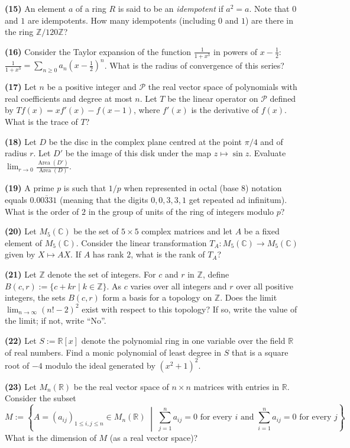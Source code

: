 \documentclass[11pt,a4paper]{article}
\newcommand{\Z}{\mathbb{Z}}
\newcommand{\R}{\mathbb{R}}
\newcommand{\C}{\mathbb{C}}
\newcommand{\qitem}[1]{\par\medskip\noindent\textbf{#1}\hspace{0.5em}}
\begin{document}
\qitem{(15)} An element $a$ of a ring $R$ is said to be an \emph{idempotent} if $a^2 = a$. Note that $0$ and $1$ are idempotents. How many idempotents (including $0$ and $1$) are there in the ring $\Z/120\Z$?

\qitem{(16)} Consider the Taylor expansion of the function $\frac{1}{1+x^3}$ in powers of $x - \frac{1}{2}$: $\frac{1}{1+x^3} = \sum_{n \ge 0} a_n\left(x - \frac{1}{2}\right)^n$. What is the radius of convergence of this series?

\qitem{(17)} Let $n$ be a positive integer and $\mathcal{P}$ the real vector space of polynomials with real coefficients and degree at most $n$. Let $T$ be the linear operator on $\mathcal{P}$ defined by $Tf(x) = xf'(x) - f(x - 1)$, where $f'(x)$ is the derivative of $f(x)$. What is the trace of $T$?

\qitem{(18)} Let $D$ be the disc in the complex plane centred at the point $\pi/4$ and of radius $r$. Let $D'$ be the image of this disk under the map $z \mapsto \sin z$. Evaluate $\lim_{r \to 0} \frac{\operatorname{Area}(D')}{\operatorname{Area}(D)}$.

\qitem{(19)} A prime $p$ is such that $1/p$ when represented in octal (base $8$) notation equals $0.\overline{00331}$ (meaning that the digits $0, 0, 3, 3, 1$ get repeated ad infinitum). What is the order of $2$ in the group of units of the ring of integers modulo $p$?

\qitem{(20)} Let $M_5(\C)$ be the set of $5 \times 5$ complex matrices and let $A$ be a fixed element of $M_5(\C)$. Consider the linear transformation $T_A : M_5(\C) \to M_5(\C)$ given by $X \mapsto AX$. If $A$ has rank $2$, what is the rank of $T_A$?

\qitem{(21)} Let $\Z$ denote the set of integers. For $c$ and $r$ in $\Z$, define $B(c, r) := \{c + kr \mid k \in \Z\}$. As $c$ varies over all integers and $r$ over all positive integers, the sets $B(c, r)$ form a basis for a topology on $\Z$. Does the limit $\lim_{n \to \infty} (n! - 2)^2$ exist with respect to this topology? If so, write the value of the limit; if not, write ``No''.

\qitem{(22)} Let $S := \R[x]$ denote the polynomial ring in one variable over the field $\R$ of real numbers. Find a monic polynomial of least degree in $S$ that is a square root of $-4$ modulo the ideal generated by $(x^2 + 1)^2$.

\qitem{(23)} Let $M_n(\R)$ be the real vector space of $n \times n$ matrices with entries in $\R$. Consider the subset
\[
  M := \left\{A = (a_{ij})_{1 \le i, j \le n} \in M_n(\R) \;\middle|\; \sum_{j=1}^{n} a_{ij} = 0 \text{ for every } i \text{ and } \sum_{i=1}^{n} a_{ij} = 0 \text{ for every } j\right\}.
\]
What is the dimension of $M$ (as a real vector space)?
\end{document}
